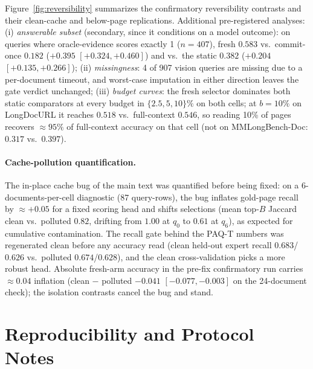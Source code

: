 \documentclass[letterpaper]{article} %
\newcommand{\paqt}{\textsc{PAQ-T}}
\begin{document}
Figure~\ref{fig:reversibility} summarizes the confirmatory reversibility contrasts and their clean-cache and below-page replications. Additional pre-registered analyses: (i) \emph{answerable subset} (secondary, since it conditions on a model outcome): on queries where oracle-evidence scores exactly 1 ($n=407$), fresh $0.583$ vs.\ commit-once $0.182$ ($+0.395$ $[+0.324,+0.460]$) and vs.\ the static $0.382$ ($+0.204$ $[+0.135,+0.266]$); (ii) \emph{missingness}: 4 of 907 vision queries are missing due to a per-document timeout, and worst-case imputation in either direction leaves the gate verdict unchanged; (iii) \emph{budget curves}: the fresh selector dominates both static comparators at every budget in $\{2.5, 5, 10\}\%$ on both cells; at $b=10\%$ on LongDocURL it reaches $0.518$ vs.\ full-context $0.546$, so reading 10\% of pages recovers ${\approx}95\%$ of full-context accuracy on that cell (not on MMLongBench-Doc: $0.317$ vs.\ $0.397$).

\paragraph{Cache-pollution quantification.} The in-place cache bug of the main text was quantified before being fixed: on a 6-documents-per-cell diagnostic (87 query-rows), the bug inflates gold-page recall by ${\approx}+0.05$ for a fixed scoring head and shifts selections (mean top-$B$ Jaccard clean vs.\ polluted $0.82$, drifting from $1.00$ at $q_0$ to $0.61$ at $q_6$), as expected for cumulative contamination. The recall gate behind the \paqt{} numbers was regenerated clean before any accuracy read (clean held-out expert recall $0.683$/$0.626$ vs.\ polluted $0.674$/$0.628$), and the clean cross-validation picks a more robust head. Absolute fresh-arm accuracy in the pre-fix confirmatory run carries ${\approx}0.04$ inflation (clean $-$ polluted $-0.041$ $[-0.077,-0.003]$ on the 24-document check); the isolation contrasts cancel the bug and stand.

\section{Reproducibility and Protocol Notes}\label{app:repro}
\end{document}
